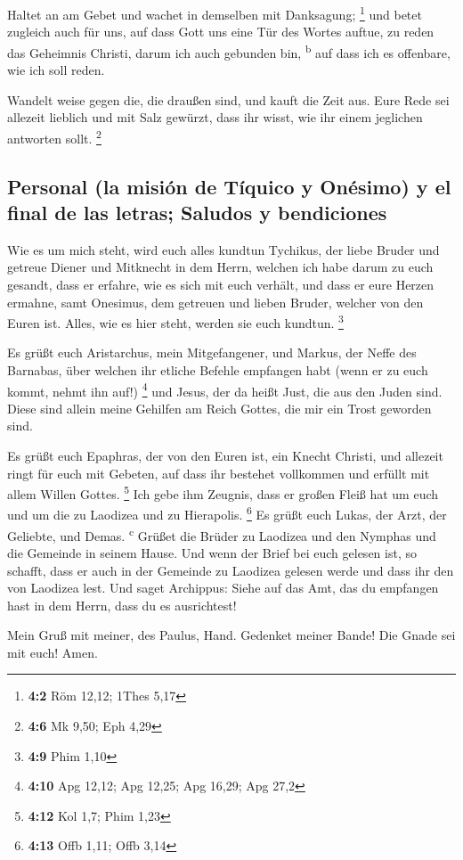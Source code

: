  Haltet an am Gebet und wachet in demselben mit
Danksagung; \footnote{\textbf{4:2} Röm 12,12; 1Thes 5,17} 
und betet zugleich auch für uns, auf dass Gott uns eine Tür des Wortes
auftue, zu reden das Geheimnis Christi, darum ich auch gebunden bin,
\textsuperscript{b}  auf dass ich es offenbare, wie ich
soll reden.

 Wandelt weise gegen die, die draußen sind, und kauft die
Zeit aus.  Eure Rede sei allezeit lieblich und mit Salz
gewürzt, dass ihr wisst, wie ihr einem jeglichen antworten sollt.
\footnote{\textbf{4:6} Mk 9,50; Eph 4,29}

\hypertarget{personal-la-misiuxf3n-de-tuxedquico-y-onuxe9simo-y-el-final-de-las-letras-saludos-y-bendiciones}{%
\subsection{Personal (la misión de Tíquico y Onésimo) y el final de las
letras; Saludos y
bendiciones}\label{personal-la-misiuxf3n-de-tuxedquico-y-onuxe9simo-y-el-final-de-las-letras-saludos-y-bendiciones}}

 Wie es um mich steht, wird euch alles kundtun Tychikus,
der liebe Bruder und getreue Diener und Mitknecht in dem Herrn,
 welchen ich habe darum zu euch gesandt, dass er erfahre,
wie es sich mit euch verhält, und dass er eure Herzen ermahne,
 samt Onesimus, dem getreuen und lieben Bruder, welcher
von den Euren ist. Alles, wie es hier steht, werden sie euch kundtun.
\footnote{\textbf{4:9} Phim 1,10}

 Es grüßt euch Aristarchus, mein Mitgefangener, und
Markus, der Neffe des Barnabas, über welchen ihr etliche Befehle
empfangen habt (wenn er zu euch kommt, nehmt ihn auf!) \footnote{\textbf{4:10}
  Apg 12,12; Apg 12,25; Apg 16,29; Apg 27,2}  und Jesus,
der da heißt Just, die aus den Juden sind. Diese sind allein meine
Gehilfen am Reich Gottes, die mir ein Trost geworden sind.

 Es grüßt euch Epaphras, der von den Euren ist, ein
Knecht Christi, und allezeit ringt für euch mit Gebeten, auf dass ihr
bestehet vollkommen und erfüllt mit allem Willen Gottes. \footnote{\textbf{4:12}
  Kol 1,7; Phim 1,23}  Ich gebe ihm Zeugnis, dass er
großen Fleiß hat um euch und um die zu Laodizea und zu Hierapolis.
\footnote{\textbf{4:13} Offb 1,11; Offb 3,14}  Es grüßt
euch Lukas, der Arzt, der Geliebte, und Demas. \textsuperscript{c}
 Grüßet die Brüder zu Laodizea und den Nymphas und die
Gemeinde in seinem Hause.  Und wenn der Brief bei euch
gelesen ist, so schafft, dass er auch in der Gemeinde zu Laodizea
gelesen werde und dass ihr den von Laodizea lest.  Und
saget Archippus: Siehe auf das Amt, das du empfangen hast in dem Herrn,
dass du es ausrichtest!

 Mein Gruß mit meiner, des Paulus, Hand. Gedenket meiner
Bande! Die Gnade sei mit euch! Amen.
